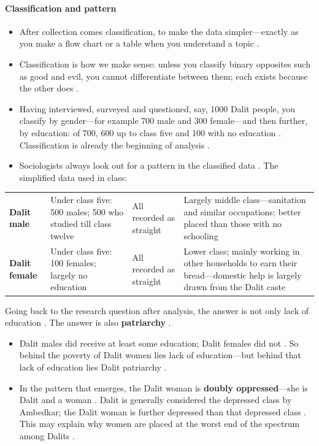 \paragraph{Classification and pattern}
\begin{itemize}
    \item After collection comes classification, to make the data simpler---exactly as you make a flow chart or a table when you understand a topic .
    \item Classification is how we make sense: unless you classify binary opposites such as good and evil, you cannot differentiate between them; each exists because the other does .
    \item Having interviewed, surveyed and questioned, say, 1000 Dalit people, you classify by gender---for example 700 male and 300 female---and then further, by education: of 700, 600 up to class five and 100 with no education . Classification is already the beginning of analysis .
    \item Sociologists always look out for a pattern in the classified data . The simplified data used in class:
\end{itemize}

\vspace{6pt}
\noindent
\begin{tabularx}{\textwidth}{p{2.5cm} p{4cm} p{2.2cm} Y}
\toprule
{}
 &  &  &  \\
\midrule
\textbf{Dalit male} & Under class five: 500 males; 500 who studied till class twelve & All recorded as straight & Largely middle class---sanitation and similar occupations; better placed than those with no schooling  \\
\textbf{Dalit female} & Under class five: 100 females; largely no education & All recorded as straight & Lower class; mainly working in other households to earn their bread---domestic help is largely drawn from the Dalit caste  \\
\bottomrule
\end{tabularx}
\vspace{6pt}

\begin{KeyConcept}
Going back to the research question after analysis, the answer is not only lack of education . The answer is also \textbf{patriarchy} .
\begin{itemize}
    \item Dalit males did receive at least some education; Dalit females did not . So behind the poverty of Dalit women lies lack of education---but behind that lack of education lies Dalit patriarchy .
    \item In the pattern that emerges, the Dalit woman is \textbf{doubly oppressed}---she is Dalit and a woman . Dalit is generally considered the depressed class by Ambedkar; the Dalit woman is further depressed than that depressed class . This may explain why women are placed at the worst end of the spectrum among Dalits .
\end{itemize}
\end{KeyConcept}

